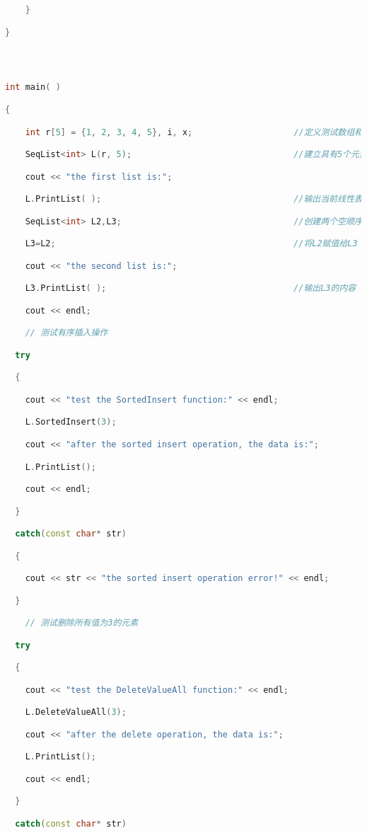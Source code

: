 \begin{lstlisting}[language=C++]
    }

}

  
  

int main( )

{

    int r[5] = {1, 2, 3, 4, 5}, i, x;                    //定义测试数组和变量

    SeqList<int> L(r, 5);                                //建立具有5个元素的顺序表

    cout << "the first list is:";

    L.PrintList( );                                      //输出当前线性表1 2 3 4 5

    SeqList<int> L2,L3;                                  //创建两个空顺序表

    L3=L2;                                               //将L2赋值给L3

    cout << "the second list is:";

    L3.PrintList( );                                     //输出L3的内容

    cout << endl;

    // 测试有序插入操作

  try

  {

    cout << "test the SortedInsert function:" << endl;

    L.SortedInsert(3);

    cout << "after the sorted insert operation, the data is:";

    L.PrintList();

    cout << endl;

  }

  catch(const char* str)

  {

    cout << str << "the sorted insert operation error!" << endl;

  }

    // 测试删除所有值为3的元素

  try

  {

    cout << "test the DeleteValueAll function:" << endl;

    L.DeleteValueAll(3);

    cout << "after the delete operation, the data is:";

    L.PrintList();

    cout << endl;

  }

  catch(const char* str)


\end{lstlisting}
